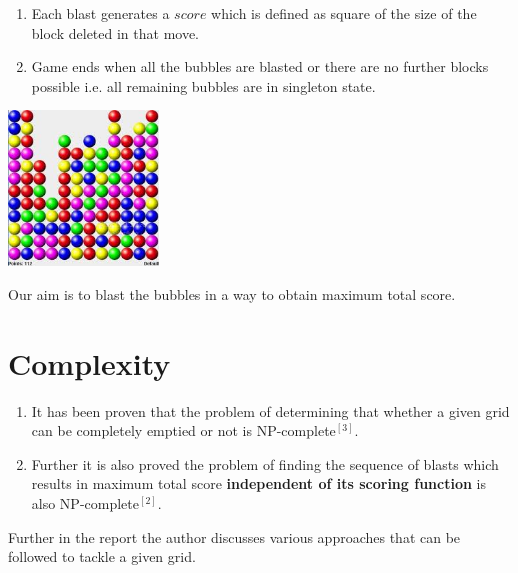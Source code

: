 \documentclass[twoside]{article}
\begin{document}
\begin{multicols}{2}
\begin{enumerate}
\item Each blast generates a $score$ which is defined as square of the size of the block deleted in that move.
\item Game ends when all the bubbles are blasted or there are no further blocks possible i.e. all remaining bubbles are in singleton state.
\end{enumerate}
\begin{center}\includegraphics[width=4cm]{index.jpeg}\end{center}
Our aim is to blast the bubbles in a way to obtain maximum total score.

\section{Complexity}
\begin{enumerate}
\item It has been proven that the problem of determining that whether a given grid can be completely emptied or not is NP-complete$^{[3]}$. 
\item Further it is also proved the problem of finding the sequence of blasts which results in maximum total score \textbf{independent of its scoring function} is also NP-complete$^{[2]}$.
\end{enumerate}
Further in the report the author discusses various approaches that can be followed to tackle a given grid.

\end{multicols}
\end{document}
